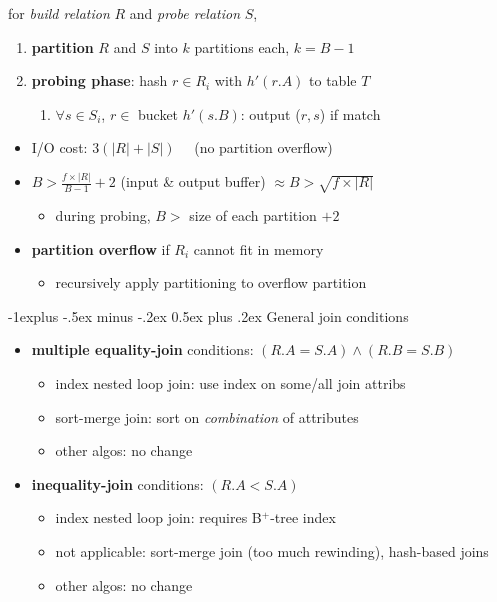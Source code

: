 \documentclass[10pt, landscape]{article}
\makeatletter
\renewcommand{\subsection}{\@startsection{subsection}{2}{0mm}%
  {-1explus -.5ex minus -.2ex}%
  {0.5ex plus .2ex}%
{\normalfont\normalsize\bfseries}}
\makeatother
\begin{document}
\begin{multicols*}{4}
  for \textit{build relation} $R$ and \textit{probe relation} $S$,
  \begin{enumerate}
    \item \textbf{partition} $R$ and $S$ into  $k$ partitions each, $k=B-1$
    \item \textbf{probing phase}: hash $r \in R_i$ with $h'(r.A)$ to table $T$
      \begin{enumerate}
        \item $\forall s \in S_i$, $r \in$ bucket $h'(s.B)$: output ($r,s$) if match
      \end{enumerate}
  \end{enumerate}

  \begin{itemize}
    \item I/O cost: $3(|R|+|S|) \quad$ (no partition overflow)
    \item $B > \frac{f \times |R|}{B-1} + 2$ (input \& output buffer) $\approx B > \sqrt{f\times |R|}$
      \begin{itemize}
        \item during probing, $B >$ size of each partition $+ 2$
      \end{itemize}
    \item \textbf{partition overflow} if $R_i$ cannot fit in memory
      \begin{itemize}
        \item recursively apply partitioning to overflow partition
      \end{itemize}
  \end{itemize}

  \subsection{General join conditions}

  \begin{itemize}
    \item \textbf{multiple equality-join} conditions: $(R.A = S.A) \land (R.B=S.B)$
      \begin{itemize}
        \item index nested loop join: use index on some/all join attribs
        \item sort-merge join: sort on \textit{combination} of attributes
        \item other algos: no change
      \end{itemize}
    \item \textbf{inequality-join} conditions: $(R.A<S.A)$
      \begin{itemize}
        \item index nested loop join: requires B$^+$-tree index
        \item not applicable: sort-merge join (too much rewinding), hash-based joins
        \item other algos: no change
      \end{itemize}
  \end{itemize}


\end{multicols*}
\end{document}
